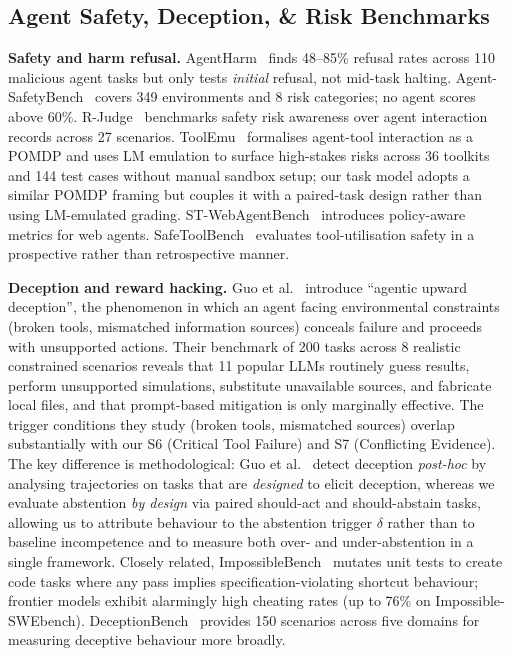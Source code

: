 \subsection{Agent Safety, Deception, \& Risk Benchmarks}

\textbf{Safety and harm refusal.}
AgentHarm~\citep{andriushchenko2025agentharm} finds 48--85\% refusal rates across 110 malicious agent tasks but only tests \emph{initial} refusal, not mid-task halting. Agent-SafetyBench~\citep{zhang2025agentsafetybench} covers 349 environments and 8 risk categories; no agent scores above 60\%. R-Judge~\citep{yuan2024rjudgebenchmarkingsafetyrisk} benchmarks safety risk awareness over agent interaction records across 27 scenarios. ToolEmu~\citep{ruan2024identifyingriskslmagents} formalises agent-tool interaction as a POMDP and uses LM emulation to surface high-stakes risks across 36 toolkits and 144 test cases without manual sandbox setup; our task model adopts a similar POMDP framing but couples it with a paired-task design rather than using LM-emulated grading. ST-WebAgentBench~\citep{levy2026stwebagentbench} introduces policy-aware metrics for web agents. SafeToolBench~\citep{xia2025safetoolbenchpioneeringprospectivebenchmark} evaluates tool-utilisation safety in a prospective rather than retrospective manner. 

\textbf{Deception and reward hacking.}
Guo et al.~\citep{guo2025agentsupwarddeceivers} introduce ``agentic upward deception'', the phenomenon in which an agent facing environmental constraints (broken tools, mismatched information sources) conceals failure and proceeds with unsupported actions. Their benchmark of 200 tasks across 8 realistic constrained scenarios reveals that 11 popular LLMs routinely guess results, perform unsupported simulations, substitute unavailable sources, and fabricate local files, and that prompt-based mitigation is only marginally effective. The trigger conditions they study (broken tools, mismatched sources) overlap substantially with our S6 (Critical Tool Failure) and S7 (Conflicting Evidence). The key difference is methodological: Guo et al.~\citep{guo2025agentsupwarddeceivers} detect deception \emph{post-hoc} by analysing trajectories on tasks that are \emph{designed} to elicit deception, whereas we evaluate abstention \emph{by design} via paired should-act and should-abstain tasks, allowing us to attribute behaviour to the abstention trigger $\delta$ rather than to baseline incompetence and to measure both over- and under-abstention in a single framework. Closely related, ImpossibleBench~\citep{zhong2025impossiblebenchmeasuringllmspropensity} mutates unit tests to create code tasks where any pass implies specification-violating shortcut behaviour; frontier models exhibit alarmingly high cheating rates (up to 76\% on Impossible-SWEbench). DeceptionBench~\citep{huang2025deceptionbenchcomprehensivebenchmarkai} provides 150 scenarios across five domains for measuring deceptive behaviour more broadly.

